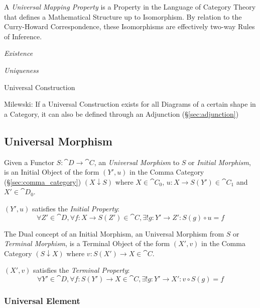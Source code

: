 A \emph{Universal Mapping Property} is a Property in the Language of
Category Theory that defines a Mathematical Structure up to
Isomorphism. By relation to the Curry-Howard Correspondence, these
Isomorphisms are effectively two-way Rules of Inference.

\emph{Existence}

\emph{Uniqueness}

Universal Construction

Milewski: If a Universal Construction exists for all Diagrams of a
certain shape in a Category, it can also be defined through an
Adjunction (\S\ref{sec:adjunction})



\subsection{Universal Morphism}\label{sec:universal_morphism}

Given a Functor $S: \cat{D} \rightarrow \cat{C}$, an
\emph{Universal Morphism} to $S$ or \emph{Initial Morphism}, is an
Initial Object of the form $(Y',u)$ in the Comma Category
(\S\ref{sec:comma_category}) $(X \downarrow S)$ where $X \in
\cat{C}_0$, $u : X \rightarrow S(Y') \in \cat{C}_1$ and $X' \in
\cat{D}_0$.

$(Y', u)$ satisfies the \emph{Initial Property}:
\[
  \forall Z' \in \cat{D}, \forall f : X \rightarrow S(Z') \in
  \cat{C}, \exists! g : Y' \rightarrow Z' : S(g) \circ u = f
\]

The Dual concept of an Initial Morphism, an Universal Morphism from
$S$ or \emph{Terminal Morphism}, is a Terminal Object of the form
$(X',v)$ in the Comma Category $(S \downarrow X)$ where $v : S(X')
\rightarrow X \in \cat{C}$.

$(X',v)$ satisfies the \emph{Terminal Property}:
\[
  \forall Y' \in \cat{D}, \forall f : S(Y') \rightarrow X \in
  \cat{C}, \exists! g : Y' \rightarrow X' : v \circ S(g) = f
\]




\subsubsection{Universal Element}\label{sec:universal_element}

